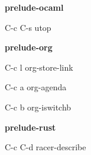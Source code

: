 \documentclass[10pt]{article}
\renewcommand\subsection[1]{\smallskip\par\textbf{\color{heading}#1}}
\begin{document}
\begin{multicols}{4}
  \subsection{prelude-ocaml}
  \begin{keylist}
  \item[C-c C-s] utop
  \end{keylist}

  \subsection{prelude-org}
  \begin{keylist}
  \item[C-c l] org-store-link
  \item[C-c a] org-agenda
  \item[C-c b] org-iswitchb
  \end{keylist}

  \subsection{prelude-rust}
  \begin{keylist}
  \item[C-c C-d] racer-describe
  \end{keylist}

\end{multicols}
\end{document}
